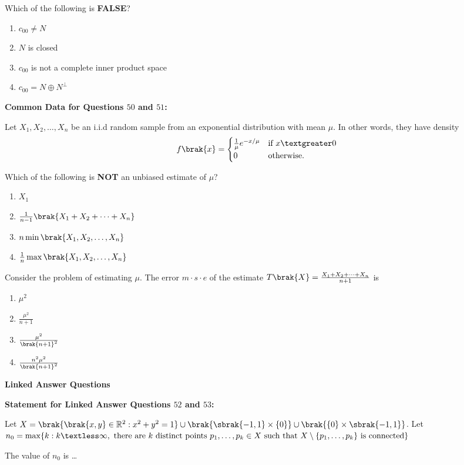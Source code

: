     \item Which of the following is \textbf{FALSE}?
    \begin{enumerate}
        \item $c_{00} \neq N$
        \item $N$ is closed
        \item $c_{00}$ is not a complete inner product space
        \item $c_{00} = N \oplus N^{\perp}$
    \end{enumerate}
\textbf{ Common Data for Questions $50$ and $51$:}

    Let $X_1, X_2, \dots, X_n$ be an i.i.d random sample from an exponential distribution with mean $\mu$. In other words, they have density
    \[
    f \brak{x} = 
    \begin{cases}
      \frac{1}{\mu} e^{-x / \mu} & \text{if } x \textgreater 0 \\
      0 & \text{otherwise}.
    \end{cases}
    \]

    \item Which of the following is \textbf{NOT} an unbiased estimate of $\mu$?
    \begin{enumerate}
        \item $X_1$
        \item $\frac{1}{n-1} \brak{X_1 + X_2 + \dots + X_n}$
        \item $n  \min \brak{X_1, X_2, \dots, X_n}$
        \item $\frac{1}{n}  \max \brak{X_1, X_2, \dots, X_n}$
    \end{enumerate}

    \item Consider the problem of estimating $\mu$. The  error $m \cdot s \cdot e$  of the estimate $T \brak{X} = \frac{X_1 + X_2 + \dots + X_n}{n + 1}$ is
    \begin{enumerate}
        \item $\mu^2$
        \item $\frac{\mu^2}{n + 1}$
        \item $\frac{ \mu^2}{\brak{n + 1}^2}$
        \item $\frac{n^2 \mu^2}{\brak{n + 1}^2}$
    \end{enumerate}

\textbf{ Linked Answer Questions}

   \textbf{ Statement for Linked Answer Questions $52$ and $53$:}

    Let $X = \brak{\brak{x, y} \in \mathbb{R}^2 : x^2 + y^2 = 1} \cup \brak{\sbrak{-1, 1} \times \{0\}} \cup \brak{\{0\} \times \sbrak{-1, 1}}$. Let $n_0 = \max \{k : k \textless \infty, \text{ there are } k \text{ distinct points } p_1, \dots, p_k \in X \text{ such that } X \setminus \{p_1, \dots, p_k\} \text{ is connected} \}$

    \item The value of $n_0$ is \dots









